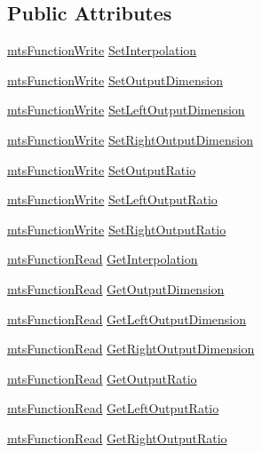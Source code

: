 \subsection*{Public Attributes}
\begin{DoxyCompactItemize}
\item 
\hyperlink{classmts_function_write}{mts\+Function\+Write} \hyperlink{class_i_req_filter_image_resizer_a7c4a8f8578b8869d52d01c5b49d539d8}{Set\+Interpolation}
\item 
\hyperlink{classmts_function_write}{mts\+Function\+Write} \hyperlink{class_i_req_filter_image_resizer_a1f750013b1cc498c12b85635620daeba}{Set\+Output\+Dimension}
\item 
\hyperlink{classmts_function_write}{mts\+Function\+Write} \hyperlink{class_i_req_filter_image_resizer_a69b15318ca531eecd5b0e895c1c6fca5}{Set\+Left\+Output\+Dimension}
\item 
\hyperlink{classmts_function_write}{mts\+Function\+Write} \hyperlink{class_i_req_filter_image_resizer_a7aa158be40abd90f5bff2f0f000a80e9}{Set\+Right\+Output\+Dimension}
\item 
\hyperlink{classmts_function_write}{mts\+Function\+Write} \hyperlink{class_i_req_filter_image_resizer_ae407fe4ae2ad3ff0c50f113145b40811}{Set\+Output\+Ratio}
\item 
\hyperlink{classmts_function_write}{mts\+Function\+Write} \hyperlink{class_i_req_filter_image_resizer_a115b520fe839eb342a084200e1952e2f}{Set\+Left\+Output\+Ratio}
\item 
\hyperlink{classmts_function_write}{mts\+Function\+Write} \hyperlink{class_i_req_filter_image_resizer_af77849e0dac81b2ae79f64eed2485a2c}{Set\+Right\+Output\+Ratio}
\item 
\hyperlink{classmts_function_read}{mts\+Function\+Read} \hyperlink{class_i_req_filter_image_resizer_af0c7b4eb059b122716e34ef51bb3568b}{Get\+Interpolation}
\item 
\hyperlink{classmts_function_read}{mts\+Function\+Read} \hyperlink{class_i_req_filter_image_resizer_a7922ac938697dc3b76efbba17edab292}{Get\+Output\+Dimension}
\item 
\hyperlink{classmts_function_read}{mts\+Function\+Read} \hyperlink{class_i_req_filter_image_resizer_a65dbb99358f14b6cf68dbf37115ed641}{Get\+Left\+Output\+Dimension}
\item 
\hyperlink{classmts_function_read}{mts\+Function\+Read} \hyperlink{class_i_req_filter_image_resizer_a8010246d528fead6f1e145aadbd77459}{Get\+Right\+Output\+Dimension}
\item 
\hyperlink{classmts_function_read}{mts\+Function\+Read} \hyperlink{class_i_req_filter_image_resizer_a85fa3c75de703949a530dfb649962594}{Get\+Output\+Ratio}
\item 
\hyperlink{classmts_function_read}{mts\+Function\+Read} \hyperlink{class_i_req_filter_image_resizer_ab80ab30199a41a4bff2ed40dd8326061}{Get\+Left\+Output\+Ratio}
\item 
\hyperlink{classmts_function_read}{mts\+Function\+Read} \hyperlink{class_i_req_filter_image_resizer_a74cd2f32abb987969a3cfc0787af937a}{Get\+Right\+Output\+Ratio}
\end{DoxyCompactItemize}



